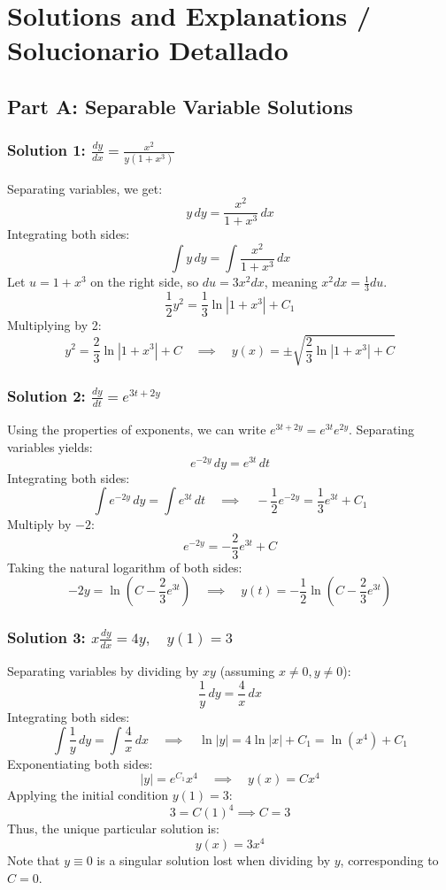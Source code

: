 \documentclass[11pt,letterpaper]{article}
\begin{document}
\newpage
\section{Solutions and Explanations / Solucionario Detallado}

\subsection*{Part A: Separable Variable Solutions}

\subsubsection*{Solution 1: $\frac{dy}{dx} = \frac{x^2}{y(1+x^3)}$}
Separating variables, we get:
\[ y \, dy = \frac{x^2}{1+x^3} \, dx \]
Integrating both sides:
\[ \int y \, dy = \int \frac{x^2}{1+x^3} \, dx \]
Let $u = 1+x^3$ on the right side, so $du = 3x^2 dx$, meaning $x^2 dx = \frac{1}{3}du$.
\[ \frac{1}{2}y^2 = \frac{1}{3}\ln|1+x^3| + C_1 \]
Multiplying by 2:
\[ y^2 = \frac{2}{3}\ln|1+x^3| + C \quad \implies \quad y(x) = \pm \sqrt{\frac{2}{3}\ln|1+x^3| + C} \]

\subsubsection*{Solution 2: $\frac{dy}{dt} = e^{3t+2y}$}
Using the properties of exponents, we can write $e^{3t+2y} = e^{3t} e^{2y}$. Separating variables yields:
\[ e^{-2y} \, dy = e^{3t} \, dt \]
Integrating both sides:
\[ \int e^{-2y} \, dy = \int e^{3t} \, dt \quad \implies \quad -\frac{1}{2} e^{-2y} = \frac{1}{3} e^{3t} + C_1 \]
Multiply by $-2$:
\[ e^{-2y} = -\frac{2}{3} e^{3t} + C \]
Taking the natural logarithm of both sides:
\[ -2y = \ln\left( C - \frac{2}{3} e^{3t} \right) \quad \implies \quad y(t) = -\frac{1}{2} \ln\left( C - \frac{2}{3} e^{3t} \right) \]

\subsubsection*{Solution 3: $x \frac{dy}{dx} = 4y, \quad y(1) = 3$}
Separating variables by dividing by $xy$ (assuming $x \neq 0, y \neq 0$):
\[ \frac{1}{y} \, dy = \frac{4}{x} \, dx \]
Integrating both sides:
\[ \int \frac{1}{y} \, dy = \int \frac{4}{x} \, dx \quad \implies \quad \ln|y| = 4\ln|x| + C_1 = \ln(x^4) + C_1 \]
Exponentiating both sides:
\[ |y| = e^{C_1} x^4 \quad \implies \quad y(x) = C x^4 \]
Applying the initial condition $y(1) = 3$:
\[ 3 = C(1)^4 \implies C = 3 \]
Thus, the unique particular solution is:
\[ y(x) = 3x^4 \]
Note that $y \equiv 0$ is a singular solution lost when dividing by $y$, corresponding to $C = 0$.
\end{document}
